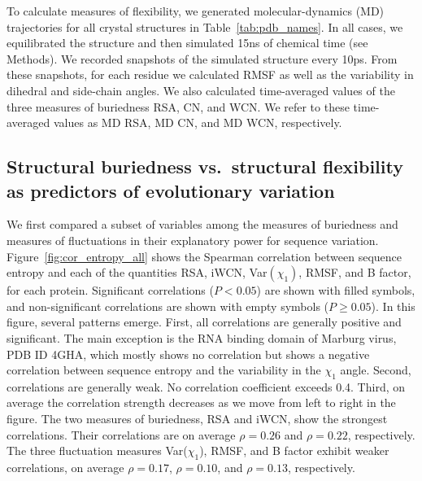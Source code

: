 \documentclass[12pt]{article}
\begin{document}
To calculate measures of flexibility, we generated molecular-dynamics (MD) trajectories for all crystal structures in Table~\ref{tab:pdb_names}. In all cases, we equilibrated the structure and then simulated 15ns of chemical time (see Methods). We recorded snapshots of the simulated structure every 10ps. From these snapshots, for each residue we calculated RMSF as well as the variability in dihedral and side-chain angles. We also calculated time-averaged values of the three measures of buriedness RSA, CN, and WCN. We refer to these time-averaged values as MD RSA, MD CN, and MD WCN, respectively.


\subsection*{Structural buriedness vs.\ structural flexibility as predictors of evolutionary variation}

We first compared a subset of variables among the measures of buriedness and measures of fluctuations in their explanatory power for sequence variation. Figure~\ref{fig:cor_entropy_all} shows the Spearman correlation between sequence entropy and each of the quantities RSA, iWCN, Var$(\chi_1)$, RMSF, and B factor, for each protein. Significant correlations ($P<0.05$) are shown with filled symbols, and non-significant correlations are shown with empty symbols ($P\geq0.05$).
In this figure, several patterns emerge. First, all correlations are generally positive and significant. The main exception is the RNA binding domain of Marburg virus, PDB ID 4GHA, which mostly shows no correlation but shows a negative correlation between sequence entropy and the variability in the $\chi_1$ angle. Second, correlations are generally weak. No correlation coefficient exceeds 0.4. Third, on average the correlation strength decreases as we move from left to right in the figure. The two measures of buriedness, RSA and iWCN, show the strongest correlations. Their correlations are on average $\rho=0.26$ and $\rho=0.22$, respectively. The three fluctuation measures Var($\chi_1$), RMSF, and B factor exhibit weaker correlations, on average $\rho=0.17$, $\rho=0.10$, and $\rho=0.13$, respectively.
\end{document}
